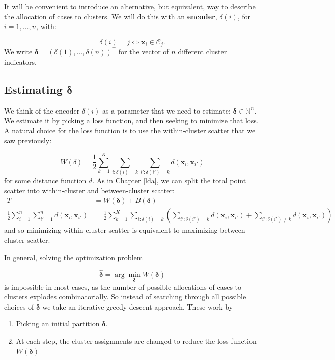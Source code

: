 \documentclass[
]{book}
\providecommand{\tightlist}{%
  \setlength{\itemsep}{0pt}\setlength{\parskip}{0pt}}
\theoremstyle{definition}
\theoremstyle{definition}
\theoremstyle{definition}
\theoremstyle{definition}
\theoremstyle{remark}
\begin{document}
It will be convenient to introduce an alternative, but equivalent, way to describe the allocation of cases to clusters. We will do this with an \textbf{encoder}, \(\delta(i)\), for \(i=1, \ldots,n\), with:

\begin{equation}
\delta(i) = j \iff \mathbf x_i \in \mathcal{C}_j. 
\label{eq:two-way}
\end{equation}
We write \(\boldsymbol \delta=(\delta(1),\ldots ,  \delta(n))^\top\) for the vector of \(n\) different cluster indicators.

\subsection{\texorpdfstring{Estimating \(\boldsymbol \delta\)}{Estimating \textbackslash boldsymbol \textbackslash delta}}\label{estimating-boldsymbol-delta}

We think of the encoder \(\delta(i)\) as a parameter that we need to estimate: \(\boldsymbol \delta\in \mathbb{N}^{n}\). We estimate it by picking a loss function, and then seeking to minimize that loss. A natural choice for the loss function is to use the within-cluster scatter that we saw previously:

\[W(\delta) = \frac{1}{2}\sum_{k=1}^K \sum_{i: \delta(i)=k} \sum_{i': \delta(i')=k} d(\mathbf x_i, \mathbf x_{i'})\]
for some distance function \(d\). As in Chapter \ref{lda}, we can split the total point scatter into within-cluster and between-cluster scatter:
\begin{align}
T&= W(\boldsymbol \delta)+B(\boldsymbol \delta)\\
\frac{1}{2}\sum_{i=1}^n \sum_{i'=1}^n d(\mathbf x_i, \mathbf x_{i'})&= \frac{1}{2}\sum_{k=1}^K \sum_{i: \delta(i)=k} \left(\sum_{i': \delta(i')=k} d(\mathbf x_i, \mathbf x_{i'})+\sum_{i': \delta(i')\not=k} d(\mathbf x_i, \mathbf x_{i'})\right)
\end{align}
and so minimizing within-cluster scatter is equivalent to maximizing between-cluster scatter.

In general, solving the optimization problem

\[\hat{\boldsymbol \delta} = \arg \min_{\boldsymbol \delta} W(\boldsymbol \delta)\]
is impossible in most cases, as the number of possible allocations of cases to clusters explodes combinatorially. So instead of searching through all possible choices of \(\boldsymbol \delta\) we take an iterative greedy descent approach. These work by

\begin{enumerate}
\def\labelenumi{\arabic{enumi}.}
\tightlist
\item
  Picking an initial partition \(\boldsymbol \delta\).
\item
  At each step, the cluster assignments are changed to reduce the loss function \(W(\boldsymbol \delta)\)
\end{enumerate}
\end{document}

